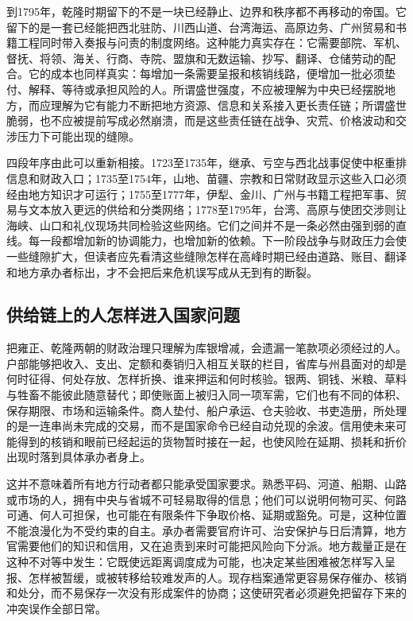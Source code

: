 到1795年，乾隆时期留下的不是一块已经静止、边界和秩序都不再移动的帝国。它留下的是一套已经能把西北驻防、川西山道、台湾海运、高原边务、广州贸易和书籍工程同时带入奏报与问责的制度网络。这种能力真实存在：它需要部院、军机、督抚、将领、海关、行商、寺院、盟旗和无数运输、抄写、翻译、仓储劳动的配合。它的成本也同样真实：每增加一条需要呈报和核销线路，便增加一批必须垫付、解释、等待或承担风险的人。所谓盛世强度，不应被理解为中央已经摆脱地方，而应理解为它有能力不断把地方资源、信息和关系接入更长责任链；所谓盛世脆弱，也不应被提前写成必然崩溃，而是这些责任链在战争、灾荒、价格波动和交涉压力下可能出现的缝隙。

四段年序由此可以重新相接。1723至1735年，继承、亏空与西北战事促使中枢重排信息和财政入口；1735至1754年，山地、苗疆、宗教和日常财政显示这些入口必须经由地方知识才可运行；1755至1777年，伊犁、金川、广州与书籍工程把军事、贸易与文本放入更远的供给和分类网络；1778至1795年，台湾、高原与使团交涉则让海峡、山口和礼仪现场共同检验这些网络。它们之间并不是一条必然由强到弱的直线。每一段都增加新的协调能力，也增加新的依赖。下一阶段战争与财政压力会使一些缝隙扩大，但读者应先看清这些缝隙怎样在高峰时期已经由道路、账目、翻译和地方承办者标出，才不会把后来危机误写成从无到有的断裂。

\subsection{供给链上的人怎样进入国家问题}

把雍正、乾隆两朝的财政治理只理解为库银增减，会遗漏一笔款项必须经过的人。户部能够把收入、支出、定额和奏销归入相互关联的栏目，省库与州县面对的却是何时征得、何处存放、怎样折换、谁来押运和何时核验。银两、铜钱、米粮、草料与牲畜不能彼此随意替代；即使账面上被归入同一项军需，它们也有不同的体积、保存期限、市场和运输条件。商人垫付、船户承运、仓夫验收、书吏造册，所处理的是一连串尚未完成的交易，而不是国家命令已经自动兑现的余波。信用使未来可能得到的核销和眼前已经起运的货物暂时接在一起，也使风险在延期、损耗和折价出现时落到具体承办者身上。

这并不意味着所有地方行动者都只能承受国家要求。熟悉平码、河道、船期、山路或市场的人，拥有中央与省城不可轻易取得的信息；他们可以说明何物可买、何路可通、何人可担保，也可能在有限条件下争取价格、延期或豁免。可是，这种位置不能浪漫化为不受约束的自主。承办者需要官府许可、治安保护与日后清算，地方官需要他们的知识和信用，又在追责到来时可能把风险向下分派。地方裁量正是在这种不对等中发生：它既使远距离调度成为可能，也决定某些困难被怎样写入呈报、怎样被暂缓，或被转移给较难发声的人。现存档案通常更容易保存催办、核销和处分，而不易保存一次没有形成案件的协商；这使研究者必须避免把留存下来的冲突误作全部日常。

